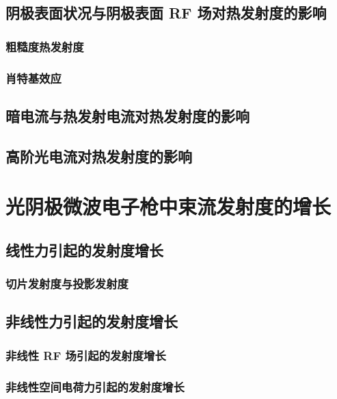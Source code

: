\subsection{阴极表面状况与阴极表面 RF 场对热发射度的影响}

\subsubsection{粗糙度热发射度}

\subsubsection{肖特基效应}

\subsection{暗电流与热发射电流对热发射度的影响}

\subsection{高阶光电流对热发射度的影响}

\section{光阴极微波电子枪中束流发射度的增长}

\subsection{线性力引起的发射度增长}

\subsubsection{切片发射度与投影发射度}

\subsection{非线性力引起的发射度增长}

\subsubsection{非线性 RF 场引起的发射度增长}

\subsubsection{非线性空间电荷力引起的发射度增长}

